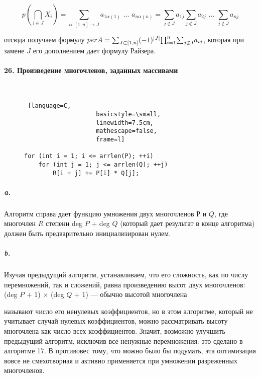 \documentclass{../../template/mai_book}
\DeclarePairedDelimiter{\abs}{\lvert}{\rvert}
\begin{document}
\begin{equation*}
p(\bigcap_{i \in J} X_i) = \sum_{\alpha : [1, n] \rightarrow \overline{J}} a_{1\alpha(1)} \text{ ... } a_{n\alpha(n)} = \sum_{j \not\in J} a_{1j} \sum_{j \not\in J} a_{2j} \text{ ... } \sum_{j \not\in J} a_{nj}
\end{equation*}

\noindent
отсюда получаем формулу $per A = {\sum}_{J \subset [1, n]} (-1)^{\abs{J}} {\prod}_{i = 1}^n {\sum}_{j \not\in J} a_{ij}$, которая при замене $J$ его дополнением дает формулу Райзера.

\paragraph{26. Произведение многочленов, заданных массивами} \mbox{}\\

\begin{wrapfigure}{r}{7.5cm}
\begin{lstlisting} [language=C,
					basicstyle=\small,
					linewidth=7.5cm,
					mathescape=false,
					frame=l]
					
for (int i = 1; i <= arrlen(P); ++i)
	for (int j = 1; j <= arrlen(Q); ++j)
		R[i + j] += P[i] * Q[j];
\end{lstlisting}
\end{wrapfigure}

\subparagraph{a.} Алгоритм справа дает \linebreak функцию умножения двух многочленов $Р$ и $Q$, где многочлен $R$ степени deg $P$ + deg $Q$ (который дает результат в конце алгоритма) должен быть предварительно инициализирован нулем. \newline

\subparagraph{b.} Изучая предыдущий алгоритм, устанавливаем, что его сложность, как по числу перемножений, так и сложений, равна произведению высот двух многочленов: (deg $P$ + 1) $\times$ (deg $Q$ + 1) — обычно высотой многочлена \linebreak

\newpage


\noindent
называют число его ненулевых коэффициентов, но в этом алгоритме, который не учитывает случай нулевых коэффициентов, можно рассматривать высоту многочлена как число всех коэффициентов. Значит, возможно улучшить предыдущий алгоритм, исключив все ненужные перемножения: это сделано в алгоритме 17. В противовес тому, что можно было бы подумать, эта оптимизация вовсе не смехотворная и активно применяется при умножении разреженных многочленов.
\end{document}
